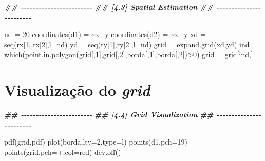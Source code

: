 \documentclass[
]{book}
\newenvironment{Shaded}{\begin{snugshade}}{\end{snugshade}}
\newcommand{\AttributeTok}[1]{\textcolor[rgb]{0.77,0.63,0.00}{#1}}
\newcommand{\DecValTok}[1]{\textcolor[rgb]{0.00,0.00,0.81}{#1}}
\newcommand{\DocumentationTok}[1]{\textcolor[rgb]{0.56,0.35,0.01}{\textbf{\textit{#1}}}}
\newcommand{\ErrorTok}[1]{\textcolor[rgb]{0.64,0.00,0.00}{\textbf{#1}}}
\newcommand{\FunctionTok}[1]{\textcolor[rgb]{0.00,0.00,0.00}{#1}}
\newcommand{\NormalTok}[1]{#1}
\newcommand{\OtherTok}[1]{\textcolor[rgb]{0.56,0.35,0.01}{#1}}
\newcommand{\SpecialCharTok}[1]{\textcolor[rgb]{0.00,0.00,0.00}{#1}}
\newcommand{\StringTok}[1]{\textcolor[rgb]{0.31,0.60,0.02}{#1}}
\theoremstyle{definition}
\theoremstyle{definition}
\theoremstyle{definition}
\theoremstyle{definition}
\theoremstyle{remark}
\begin{document}
\begin{Shaded}
\begin{Highlighting}[]
\DocumentationTok{\#\# {-}{-}{-}{-}{-}{-}{-}{-}{-}{-}{-}{-}{-}{-}{-}{-}{-}{-}{-}{-}{-}{-}{-}{-}}
\DocumentationTok{\#\# [4.3] Spatial Estimation}
\DocumentationTok{\#\# {-}{-}{-}{-}{-}{-}{-}{-}{-}{-}{-}{-}{-}{-}{-}{-}{-}{-}{-}{-}{-}{-}{-}{-}}

\NormalTok{nd }\OtherTok{=} \DecValTok{20}
\FunctionTok{coordinates}\NormalTok{(d1) }\OtherTok{=} \ErrorTok{\textasciitilde{}}\NormalTok{x}\SpecialCharTok{+}\NormalTok{y}
\FunctionTok{coordinates}\NormalTok{(d2) }\OtherTok{=} \ErrorTok{\textasciitilde{}}\NormalTok{x}\SpecialCharTok{+}\NormalTok{y}
\NormalTok{xd }\OtherTok{=} \FunctionTok{seq}\NormalTok{(rx[}\DecValTok{1}\NormalTok{],rx[}\DecValTok{2}\NormalTok{],}\AttributeTok{l=}\NormalTok{nd)}
\NormalTok{yd }\OtherTok{=} \FunctionTok{seq}\NormalTok{(ry[}\DecValTok{1}\NormalTok{],ry[}\DecValTok{2}\NormalTok{],}\AttributeTok{l=}\NormalTok{nd)}
\NormalTok{grid }\OtherTok{=} \FunctionTok{expand.grid}\NormalTok{(xd,yd)}
\NormalTok{ind }\OtherTok{=} \FunctionTok{which}\NormalTok{(}\FunctionTok{point.in.polygon}\NormalTok{(grid[,}\DecValTok{1}\NormalTok{],grid[,}\DecValTok{2}\NormalTok{],borda[,}\DecValTok{1}\NormalTok{],borda[,}\DecValTok{2}\NormalTok{])}\SpecialCharTok{\textgreater{}}\DecValTok{0}\NormalTok{)}
\NormalTok{grid }\OtherTok{=}\NormalTok{ grid[ind,]}
\end{Highlighting}
\end{Shaded}

\hypertarget{visualizauxe7uxe3o-do-grid}{%
\section{\texorpdfstring{Visualização do \emph{grid}}{Visualização do grid}}\label{visualizauxe7uxe3o-do-grid}}

\begin{Shaded}
\begin{Highlighting}[]
\DocumentationTok{\#\# {-}{-}{-}{-}{-}{-}{-}{-}{-}{-}{-}{-}{-}{-}{-}{-}{-}{-}{-}{-}{-}{-}{-}{-}}
\DocumentationTok{\#\# [4.4] Grid Visualization}
\DocumentationTok{\#\# {-}{-}{-}{-}{-}{-}{-}{-}{-}{-}{-}{-}{-}{-}{-}{-}{-}{-}{-}{-}{-}{-}{-}{-}}

\FunctionTok{pdf}\NormalTok{(}\StringTok{\textquotesingle{}grid.pdf\textquotesingle{}}\NormalTok{)}
\FunctionTok{plot}\NormalTok{(borda,}\AttributeTok{lty=}\DecValTok{2}\NormalTok{,}\AttributeTok{type=}\StringTok{\textquotesingle{}l\textquotesingle{}}\NormalTok{)}
\FunctionTok{points}\NormalTok{(d1,}\AttributeTok{pch=}\DecValTok{19}\NormalTok{)}
\FunctionTok{points}\NormalTok{(grid,}\AttributeTok{pch=}\StringTok{\textquotesingle{}+\textquotesingle{}}\NormalTok{,}\AttributeTok{col=}\StringTok{\textquotesingle{}red\textquotesingle{}}\NormalTok{)}
\FunctionTok{dev.off}\NormalTok{()}
\end{Highlighting}
\end{Shaded}
\end{document}
